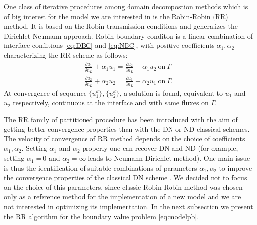 
One class of iterative procedures among domain decompostion methods which is of big interest for the model we are interested in is the Robin-Robin (RR) method. It is based on the Robin transmission conditions and generalizes the Dirichlet-Neumann approach. Robin boundary conditon is a linear combination of interface conditions \eqref{eq:DBC} and \eqref{eq:NBC}, with positive coefficients $\alpha_1, \alpha_2$ characterizing the RR scheme as follows:
\begin{equation}\begin{aligned}
  \frac{\partial u_1}{\partial n_L}  + \alpha_1 u_1 = \frac{\partial u_2}{\partial n_L} + \alpha_1 u_2 \ \text{on} \ \Gamma
  \\
  \frac{\partial u_2}{\partial n_L} + \alpha_2 u_2  =   \frac{\partial u_1}{\partial n_L}  + \alpha_2 u_1 \ \text{on} \ \Gamma.
\end{aligned} \end{equation}
At convergence of sequence $\{u_1^k\}, \{u_2^k\}$, a solution is found, equivalent to $u_1$ and $u_2$ respectively, continuous at the interface and with same fluxes on $\Gamma$.

The RR family of partitioned procedure has been introduced with the aim of getting better convergence properties than with the DN or ND classical schemes. The velocity of convergence of RR method depends on the choice of coefficients $\alpha_1, \alpha_2$. Setting $\alpha_1$ and $\alpha_2$ properly one can recover DN and ND (for example, setting $\alpha_1 = 0$ and $\alpha_2 = \infty$ leads to Neumann-Dirichlet method). One main issue is thus the identification of suitable combinations of parameters $\alpha_1, \alpha_2$ to improve the convergence properties of the classical DN scheme \cite{hou:RR, CV:RRnew}. We decided not to focus on the choice of this parameters, since classic Robin-Robin method was chosen only as a reference method for the  implementation of a new model and we are not interested in optimizing its implementation. In the next subsection we present the RR algorithm for the boundary value problem \eqref{eq:modelpb}.

